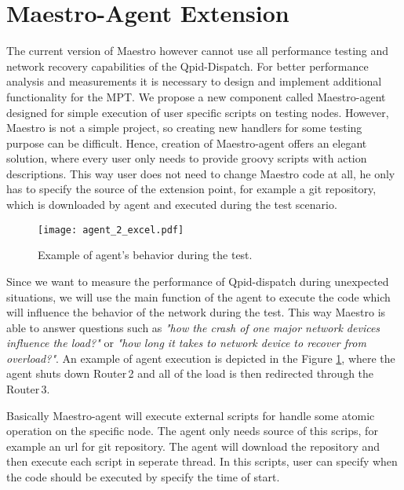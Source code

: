 \documentclass{ExcelAtFIT}
\begin{document}
\section{Maestro-Agent Extension}
\label{sec:maestro_agent}
The current version of Maestro however cannot use all performance testing and network recovery capabilities of the Qpid-Dispatch. For better performance analysis and measurements it is necessary to design and implement additional functionality for the MPT. We propose a new component called Maestro-agent designed for simple execution of user specific scripts on testing nodes. However, Maestro is not a simple project, so creating new handlers for some testing purpose can be difficult. Hence, creation of Maestro-agent offers an elegant solution, where every user only needs to provide groovy scripts with action descriptions. This way user does not need to change Maestro code at all, he only has to specify the source of the extension point, for example a git repository, which is downloaded by agent and executed during the test scenario.


\begin{figure}[h]
	\centering
	\texttt{[image: agent\_2\_excel.pdf]}
	\caption{Example of agent's behavior during the test.}
	\label{fig:agent_2}
\end{figure}

Since we want to measure the performance of Qpid-dispatch during unexpected situations, we will use the main function of the agent to execute the code which will influence the behavior of the network during the test. This way Maestro is able to answer questions such as \emph{"how the crash of one major network devices influence the load?"} or \emph{"how long it takes to network device to recover from overload?"}. An example of agent execution is depicted in the Figure \ref{fig:agent_2}, where the agent shuts down Router\,2 and all of the load is then redirected through the Router\,3.

Basically Maestro-agent will execute external scripts for handle some atomic operation on the specific node. The agent only needs source of this scrips, for example an url for git repository. The agent will download the repository and then execute each script in seperate thread. In this scripts, user can specify when the code should be executed by specify the time of start.
\end{document}
